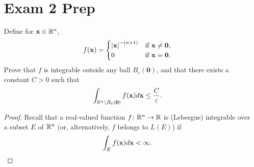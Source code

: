 \section{Exam 2 Prep}
\begin{problem}
Define for $\mathbf{x}\in\mathbb{R}^n$,
\[
f(\mathbf{x})=
\begin{cases}
\left|\mathbf{x}\right|^{-(n+1)}&\text{if $\mathbf{x}\neq \mathbf{0}$,}\\
0&\text{if $\mathbf{x}=\mathbf{0}$.}
\end{cases}
\]
Prove that $f$ is integrable outside any ball $B_\varepsilon(\mathbf{0})$,
and that there exists a constant $C>0$ such that
\[
\int_{\mathbb{R}^n\setminus B_\varepsilon(\mathbf{0})}f(\mathbf{x}) d \mathbf{x}\leq\frac{C}{\varepsilon}.
\]
\end{problem}
\begin{proof}
Recall that a real-valued function $f\colon\mathbb{R}^n\to\mathbb{R}$ is (Lebesgue)
integrable over a subset $E$ of $\mathbb{R}^n$ (or, alternatively, $f$ belongs to
$L(E)$) if
\[
\int_E f(\mathbf{x}) d \mathbf{x}<\infty.
\]


\end{proof}
